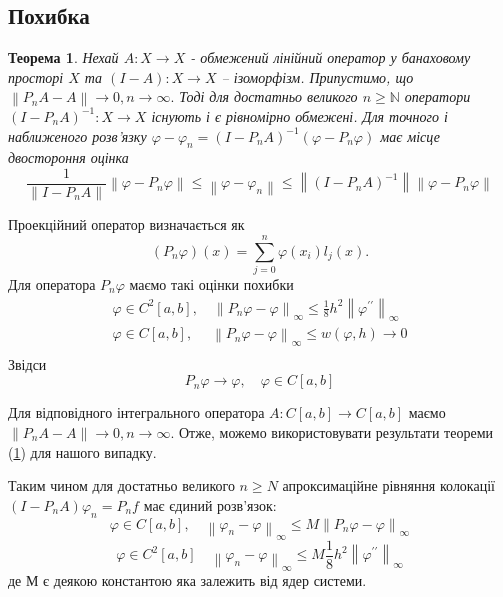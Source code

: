 \documentclass[14pt,a4paper]{extarticle}
\newcounter{e}
\newtheorem{theorem}{Теорема}[section]
\numberwithin{equation}{section}
\numberwithin{figure}{section}
\begin{document}
 
 \subsection{Похибка}
 
\begin{theorem}
	\label{collocation-error}
	Нехай $A: X \rightarrow X$ - обмежений лінійний оператор у банаховому просторі $X$ та $ (I-A):X \rightarrow X$ -- ізоморфізм. Припустимо, що $\left\|P_{n} A-A\right\| \rightarrow 0, n \rightarrow \infty .$ Тоді для достатньо великого $n \geq \mathbb{N}$ оператори $\left(I-P_{n} A\right)^{-1}: X \rightarrow X$ існують і є рівномірно обмежені. Для точного і наближеного розв'язку $\varphi-\varphi_{n}=\left(I-P_{n} A\right)^{-1}\left(\varphi-P_{n} \varphi\right)$ має місце двостороння оцінка
 \begin{equation}
	 \frac{1}{\left\|I-P_{n} A\right\|}\left\|\varphi-P_{n} \varphi\right\| \leq\left\|\varphi-\varphi_{n}\right\| \leq\left\|\left(I-P_{n} A\right)^{-1}\right\|\left\|\varphi-P_{n} \varphi\right\|
 \end{equation}
\end{theorem} 
Проекційний оператор визначається як
\begin{equation}
 \left(P_{n} \varphi\right)(x)= \sum_{j=0}^{n} \varphi\left(x_{i}\right) l_{j}(x) .
\end{equation}
 Для оператора $P_{n} \varphi$ маємо такі оцінки похибки
 $$
 \begin{array}{l}
 	\displaystyle
	\varphi \in C^{2}[a, b], \quad \left\|P_{n} \varphi-\varphi\right\|_{\infty} \leq \frac{1}{8} h^{2}\left\|\varphi^{\prime \prime}\right\|_{\infty}  
	\\[0.3cm]
 	
 	\displaystyle
	\varphi \in C[a, b], \quad \; \left\|P_{n} \varphi-\varphi\right\|_{\infty} \leq w(\varphi, h) \rightarrow 0
	\\[0.3cm]	
\end{array}
 $$
 Звідси 
 $$ 
 P_{n} \varphi \rightarrow \varphi,  \quad  \varphi \in C[a, b]
 $$
 
 Для відповідного інтегрального оператора $A: C[a, b] \rightarrow C[a, b]$ маємо $\left\|P_{n} A-A\right\| \rightarrow 0, n \rightarrow \infty$.
 Отже, можемо використовувати результати теореми (\ref{collocation-error}) для нашого випадку.

 Таким чином для достатньо великого $n \geq N$ апроксимаційне рівняння колокації $\left(I-P_{n} A\right) \varphi_{n}=P_{n} f$ має єдиний розв'язок:
\begin{equation}
	\varphi \in C[a, b], \quad \left\|\varphi_{n}-\varphi\right\|_{\infty} \leq M\left\|P_{n} \varphi-\varphi\right\|_{\infty}
\end{equation}
\begin{equation}
	\varphi \in C^{2}[a, b] \quad \left\|\varphi_{n}-\varphi\right\|_{\infty} \leq M \frac{1}{8} h^{2}\left\|\varphi^{\prime \prime}\right\|_{\infty}
\end{equation}
де М є деякою константою яка залежить від ядер системи.
\end{document}
